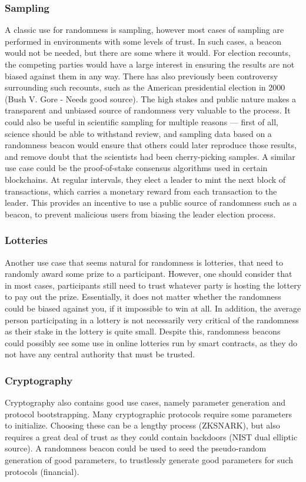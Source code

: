 \subsubsection{Sampling}
A classic use for randomness is sampling, however most cases of sampling are performed in environments with some levels of trust. In such cases, a beacon would not be needed, but there are some where it would. For election recounts, the competing parties would have a large interest in ensuring the results are not biased against them in any way. There has also previously been controversy surrounding such recounts, such as the American presidential election in 2000 (Bush V. Gore - Needs good source). The high stakes and public nature makes a transparent and unbiased source of randomness very valuable to the process.
It could also be useful in scientific sampling for multiple reasons --- first of all, science should be able to withstand review, and sampling data based on a randomness beacon would ensure that others could later reproduce those results, and remove doubt that the scientists had been cherry-picking samples.
A similar use case could be the proof-of-stake consensus algorithms used in certain blockchains. At regular intervals, they elect a leader to mint the next block of transactions, which carries a monetary reward from each transaction to the leader. This provides an incentive to use a public source of randomness such as a beacon, to prevent malicious users from biasing the leader election process.

\subsubsection{Lotteries}
Another use case that seems natural for randomness is lotteries, that need to randomly award some prize to a participant. However, one should consider that in most cases, participants still need to trust whatever party is hosting the lottery to pay out the prize. Essentially, it does not matter whether the randomness could be biased against you, if it impossible to win at all.
In addition, the average person participating in a lottery is not necessarily very critical of the randomness as their stake in the lottery is quite small.
Despite this, randomness beacons could possibly see some use in online lotteries run by smart contracts, as they do not have any central authority that must be trusted.

\subsubsection{Cryptography}
Cryptography also contains good use cases, namely parameter generation and protocol bootstrapping. Many cryptographic protocols require some parameters to initialize. Choosing these can be a lengthy process (ZKSNARK), but also requires a great deal of trust as they could contain backdoors (NIST dual elliptic source). A randomness beacon could be used to seed the pseudo-random generation of good parameters, to trustlessly generate good parameters for such protocols (financial).

